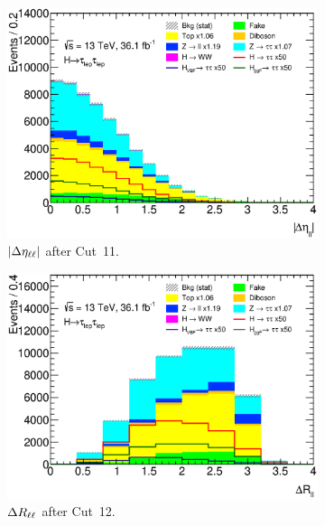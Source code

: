 \begin{figure}[htb]
\begin{subfigure}[t]{0.45\textwidth}
        \includegraphics[width=\textwidth]{./plots/event_selection/presel/ll-CutX-DeltaEtaLL-lin.eps}
        \caption{$\left|\Delta \eta_{\ell\ell}\right|$ after Cut~11.}\label{fig:event_selection:cutflow:detall}
    \end{subfigure}
    \begin{subfigure}[t]{0.45\textwidth}
        \includegraphics[width=\textwidth]{./plots/event_selection/presel/ll-CutDEtaLL-DeltaRLL-lin.eps}
        \caption{$\Delta R_{\ell\ell}$ after Cut~12.}\label{fig:event_selection:cutflow:drll}
    \end{subfigure}
    \begin{subfigure}[t]{0.45\textwidth}

\end{subfigure}
\end{figure}
